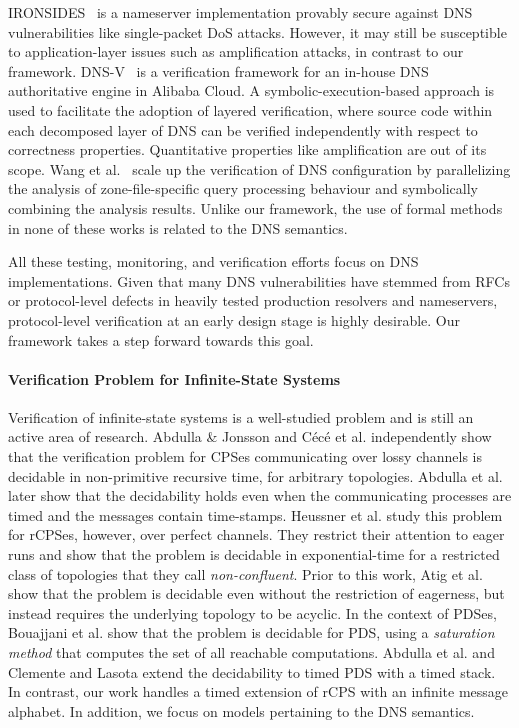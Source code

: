 IRONSIDES~\cite{Ironsides} is a nameserver
implementation provably secure against DNS vulnerabilities like single-packet DoS
attacks. 
However, it may still be susceptible to application-layer issues such as amplification attacks, in contrast to our framework. 
DNS-V~\cite{DNS-V} is a verification
framework for an in-house DNS authoritative 
engine in Alibaba Cloud.
A symbolic-execution-based approach is used to 
facilitate the adoption of layered verification, where 
source code within each decomposed layer of DNS can be verified independently with respect to correctness properties. 
Quantitative properties like amplification are out of its scope.
Wang et al.~\cite{10.1145/3663408.3663412}  scale up the verification of DNS configuration
by parallelizing the analysis of zone-file-specific query processing behaviour and symbolically combining the analysis results. 
Unlike our framework, the use of formal methods in none of these works is related to the DNS semantics.


All these testing, monitoring, and verification efforts focus on DNS implementations.
Given that many DNS vulnerabilities have stemmed
 from RFCs or protocol-level defects in heavily tested production resolvers and nameservers, protocol-level verification
 at an early design stage is highly desirable. Our framework takes a step forward towards this goal. 



\paragraph{Verification Problem for Infinite-State Systems}
Verification of infinite-state systems is a well-studied problem and is still an active area of research. Abdulla \& Jonsson \cite{AbJo:lossy,AbJo:lossy:IC} and C{\'e}c{\'e} et al. \cite{cece1996unreliable} independently show that the verification problem for CPSes communicating over lossy channels is decidable in non-primitive recursive time, for arbitrary topologies. Abdulla et al. \cite{abdulla2012timed} later show that the decidability holds even when the communicating processes are timed and the messages contain time-stamps. Heussner et al. \cite{heussner2010reachability,heussner2012reachability} study this problem for rCPSes, however, over perfect channels. They restrict their attention to eager runs and show that the problem is decidable in exponential-time for a restricted class of topologies that they call \emph{non-confluent}. Prior to this work, Atig et al. \cite{atig2008reachability} show that the problem is decidable even without the restriction of eagerness, but instead requires the underlying topology to be acyclic. In the context of PDSes, Bouajjani et al. \cite{bouajjani1997reachability} show that the problem is decidable for PDS, using a \textit{saturation method} that computes the set of all reachable computations. Abdulla et al. \cite{abdulla2012dense} and Clemente and Lasota \cite{clemente2015timed} extend the decidability to timed PDS with a timed stack. In contrast, our work handles a timed extension of rCPS with an infinite message alphabet. In addition, we focus on models pertaining to the DNS semantics.

